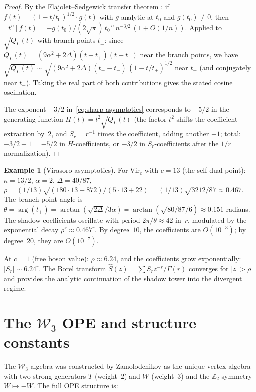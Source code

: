 \documentclass[11pt,reqno]{amsart}
\theoremstyle{definition}
\newtheorem{example}[theorem]{Example}
\theoremstyle{remark}
\newcommand{\cW}{\mathcal{W}}
\newcommand{\Vir}{\mathrm{Vir}}
\numberwithin{equation}{section}
\begin{document}
\begin{proof}
By the Flajolet--Sedgewick transfer theorem
\cite{FlajoletSedgewick}: if $f(t) = (1 - t/t_0)^{1/2}
\cdot g(t)$ with $g$ analytic at $t_0$ and $g(t_0) \ne 0$,
then
$[t^n] f(t) = -g(t_0)/(2\sqrt{\pi})\, t_0^{-n}\,
n^{-3/2}\, (1 + O(1/n))$.
Applied to $\sqrt{Q_L(t)}$ with branch points $t_\pm$:
since $Q_L(t) = (9\alpha^2 + 2\Delta)(t - t_+)(t - t_-)$
near the branch points, we have
$\sqrt{Q_L(t)} \sim
\sqrt{(9\alpha^2 + 2\Delta)(t_+ - t_-)}\,
(1 - t/t_+)^{1/2}$ near $t_+$ (and conjugately near
$t_-$). Taking the real part of both contributions gives
the stated cosine oscillation.

The exponent $-3/2$ in~\eqref{eq:sharp-asymptotics}
corresponds to $-5/2$ in the generating function
$H(t) = t^2\sqrt{Q_L(t)}$ (the factor $t^2$ shifts the
coefficient extraction by~$2$, and $S_r = r^{-1}$ times
the coefficient, adding another $-1$; total:
$-3/2 - 1 = -5/2$ in $H$-coefficients, or $-3/2$ in
$S_r$-coefficients after the $1/r$ normalization).
\end{proof}

\begin{example}[Virasoro
asymptotics]\label{ex:virasoro-asymptotics}
For $\Vir_c$ with $c = 13$ (the self-dual point):
$\kappa = 13/2$, $\alpha = 2$,
$\Delta = 40/87$,
$\rho = (1/13)\sqrt{(180 \cdot 13 + 872)/(5 \cdot 13 + 22)}
= (1/13)\sqrt{3212/87} \approx 0.467$.
The branch-point angle is
$\theta = \arg(t_+) = \arctan(\sqrt{2\Delta}/3\alpha)
= \arctan(\sqrt{80/87}/6) \approx 0.151$ radians.
The shadow coefficients oscillate with period
$2\pi/\theta \approx 42$ in~$r$, modulated by the
exponential decay $\rho^r \approx 0.467^r$. By degree~$10$,
the coefficients are $O(10^{-3})$; by degree~$20$, they are
$O(10^{-7})$.

At $c = 1$ (free boson value): $\rho \approx 6.24$, and the
coefficients grow exponentially: $|S_r| \sim 6.24^r$. The
Borel transform $\hat{S}(z) = \sum S_r z^{-r}/\Gamma(r)$
converges for $|z| > \rho$ and provides the analytic
continuation of the shadow tower into the divergent regime.
\end{example}


\section{The $\cW_3$ OPE and structure
constants}\label{app:w3-ope}

The $\cW_3$ algebra was constructed by Zamolodchikov as the
unique vertex algebra with two strong generators $T$
(weight~$2$) and $W$ (weight~$3$) and the $\mathbb{Z}_2$
symmetry $W \mapsto -W$. The full OPE structure is:
\end{document}
